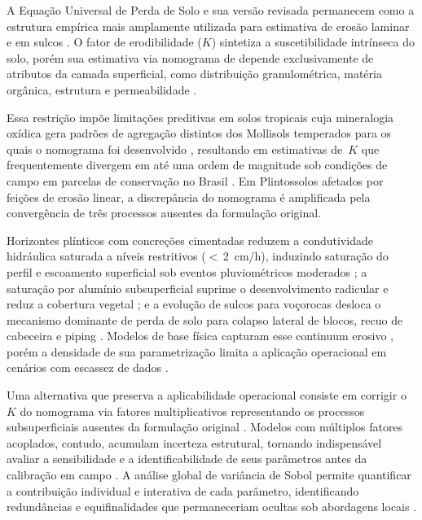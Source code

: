 \documentclass[pdflatex,sn-basic]{sn-jnl}
\begin{document}
A Equação Universal de Perda de Solo e sua versão revisada \citep{wischmeier_smith_1978,renard_et_al_1997} permanecem como a estrutura empírica mais amplamente utilizada para estimativa de erosão laminar e em sulcos \citep{alewell_et_al_2019}. O fator de erodibilidade ($K$) sintetiza a suscetibilidade intrínseca do solo, porém sua estimativa via nomograma de \citet{wischmeier_et_al_1971} depende exclusivamente de atributos da camada superficial, como distribuição granulométrica, matéria orgânica, estrutura e permeabilidade \citep{roemkens_et_al_1997}.

Essa restrição impõe limitações preditivas em solos tropicais cuja mineralogia oxídica gera padrões de agregação distintos dos Mollisols temperados para os quais o nomograma foi desenvolvido \citep{alewell_et_al_2019,cassol_et_al_2023}, resultando em estimativas de~$K$ que frequentemente divergem em até uma ordem de magnitude sob condições de campo em parcelas de conservação no Brasil \citep{silva_et_al_2009,lafayette_cantalice_coutinho_2011}. Em Plintossolos afetados por feições de erosão linear, a discrepância do nomograma é amplificada pela convergência de três processos ausentes da formulação original. 

Horizontes plínticos com concreções cimentadas reduzem a condutividade hidráulica saturada a níveis restritivos ($<$\,2~cm/h), induzindo saturação do perfil e escoamento superficial sob eventos pluviométricos moderados \citep{wang_et_al_2020,embrapa_2018,horton_1933,bertoni_lombardi_neto_2017}; a saturação por alumínio subsuperficial suprime o desenvolvimento radicular e reduz a cobertura vegetal \citep{gura_et_al_2022}; e a evolução de sulcos para voçorocas desloca o mecanismo dominante de perda de solo para colapso lateral de blocos, recuo de cabeceira e piping \citep{poesen_2018,poesen_et_al_2003,kirkby_bracken_2009,vanmaercke_et_al_2021}. Modelos de base física capturam esse continuum erosivo \citep{nearing_et_al_1989,sidorchuk_2006}, porém a densidade de sua parametrização limita a aplicação operacional em cenários com escassez de dados \citep{wilkinson_et_al_2024}.

Uma alternativa que preserva a aplicabilidade operacional consiste em corrigir o~$K$ do nomograma via fatores multiplicativos representando os processos subsuperficiais ausentes da formulação original \citep{alewell_et_al_2019}. Modelos com múltiplos fatores acoplados, contudo, acumulam incerteza estrutural, tornando indispensável avaliar a sensibilidade e a identificabilidade de seus parâmetros antes da calibração em campo \citep{saltelli_et_al_2004}. A análise global de variância de Sobol permite quantificar a contribuição individual e interativa de cada parâmetro, identificando redundâncias e equifinalidades que permaneceriam ocultas sob abordagens locais \citep{sobol_2001,francois_et_al_2024}.
\end{document}
